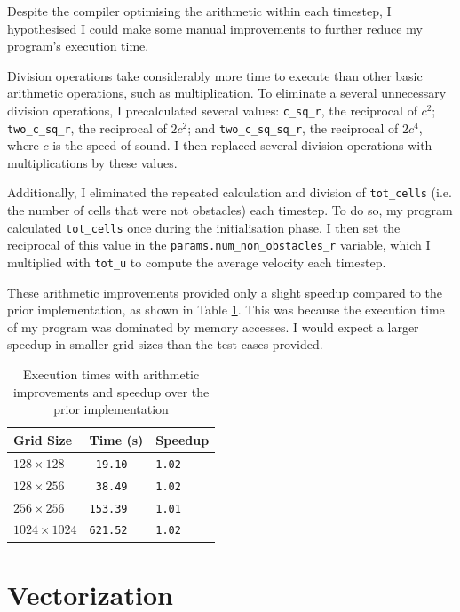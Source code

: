 \documentclass[twocolumn, a4paper]{article}
\begin{document}
Despite the compiler optimising the arithmetic within each timestep, I hypothesised I could make some manual improvements to further reduce my program's execution time.

Division operations take considerably more time to execute than other basic arithmetic operations, such as multiplication.
To eliminate a several unnecessary division operations, I precalculated several values: \texttt{c\_sq\_r}, the reciprocal of $c^2$; \texttt{two\_c\_sq\_r}, the reciprocal of $2c^2$; and \texttt{two\_c\_sq\_sq\_r}, the reciprocal of $2c^4$, where $c$ is the speed of sound.
I then replaced several division operations with multiplications by these values.

Additionally, I eliminated the repeated calculation and division of \texttt{tot\_cells} (i.e. the number of cells that were not obstacles) each timestep.
To do so, my program calculated \texttt{tot\_cells} once during the initialisation phase.
I then set the reciprocal of this value in the \texttt{params.num\_non\_obstacles\_r} variable, which I multiplied with \texttt{tot\_u} to compute the average velocity each timestep.

These arithmetic improvements provided only a slight speedup compared to the prior implementation, as shown in Table \ref{tab:arithmetic_improvements}.
This was because the execution time of my program was dominated by memory accesses.
I would expect a larger speedup in smaller grid sizes than the test cases provided.

\begin{table}[htbp]
  \begin{center}
  \caption{Execution times with arithmetic improvements and speedup over the prior implementation}\label{tab:arithmetic_improvements}
  \begin{tabular}[t]{l | l l} 
      \hline\hline
      Grid Size&Time (s)&Speedup\\
      \hline
      $128 \times 128$&\texttt{ 19.10}&\texttt{1.02}\\
      $128 \times 256$&\texttt{ 38.49}&\texttt{1.02}\\
      $256 \times 256$&\texttt{153.39}&\texttt{1.01}\\
      $1024 \times 1024$&\texttt{621.52}&\texttt{1.02}\\
      \hline
    \end{tabular}
  \end{center}
\end{table}

\section{Vectorization}
\end{document}
